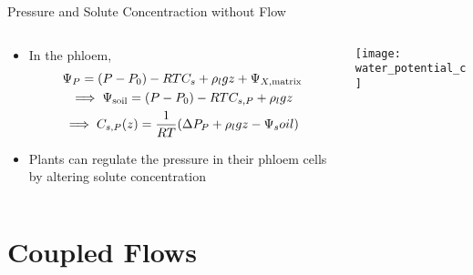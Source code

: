 \documentclass[10pt]{beamer}
\newcommand{\tn}{\textnormal}
\begin{document}
\begin{frame}{Pressure and Solute Concentraction without Flow}
  \begin{columns}
    \begin{column}{.69\textwidth}
      \begin{itemize}
      \item In the phloem, 
        \begin{multline*}
          \Psi_P = (P - P_0) - RTC_s + \rho_l g z + \Psi_{X,
            \tn{matrix}} \\
          \implies \Psi_\tn{soil} = (P - P_0) - RT C_{s, P} + \rho_l g
          z \\ 
          \implies C_{s, P} (z) = \frac{1}{RT}(\Delta P_P + \rho_l g z
          - \Psi_soil) 
        \end{multline*}
      \item Plants can regulate the pressure in their phloem cells by
        altering solute concentration
      \end{itemize}
    \end{column}
    \begin{column}{.29\textwidth}
      \vfill
      \texttt{[image: water\_potential\_c]}
      \vfill
    \end{column}
  \end{columns}
\end{frame}

\section{Coupled Flows}
\end{document}
